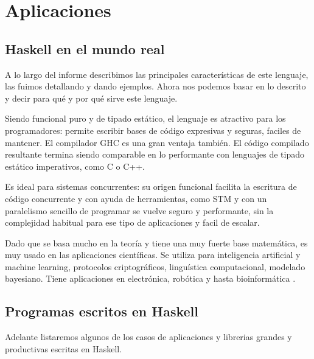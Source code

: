 \section{Aplicaciones} %
\label{sec:aplicaciones}

\subsection{Haskell en el mundo real} %
\label{sub:haskell_en_el_mundo_real}

A lo largo del informe describimos las principales características de este lenguaje, las fuimos detallando y dando ejemplos. Ahora nos podemos basar en lo descrito y decir para qué y por qué sirve este lenguaje.

Siendo funcional puro y de tipado estático, el lenguaje es atractivo para los programadores: permite escribir bases de código expresivas y seguras, faciles de mantener. El compilador GHC es una gran ventaja también. El código compilado resultante termina siendo comparable en lo performante con lenguajes de tipado estático imperativos, como C o C++.

Es ideal para sistemas concurrentes: su origen funcional facilita la escritura de código concurrente y con ayuda de herramientas, como STM y con un paralelismo sencillo de programar se vuelve seguro y performante, sin la complejidad habitual para ese tipo de aplicaciones y facil de escalar.

Dado que se basa mucho en la teoría y tiene una muy fuerte base matemática, es muy usado en las aplicaciones científicas. Se utiliza para inteligencia artificial y machine learning, protocolos criptográficos, linguística computacional, modelado bayesiano. Tiene aplicaciones en electrónica, robótica y hasta bioinformática \cite{Usecases01}.



\subsection{Programas escritos en Haskell} %
\label{sub:programas_escritos_en_haskell}

Adelante listaremos algunos de los casos de aplicaciones y librerias grandes y productivas escritas en Haskell.

